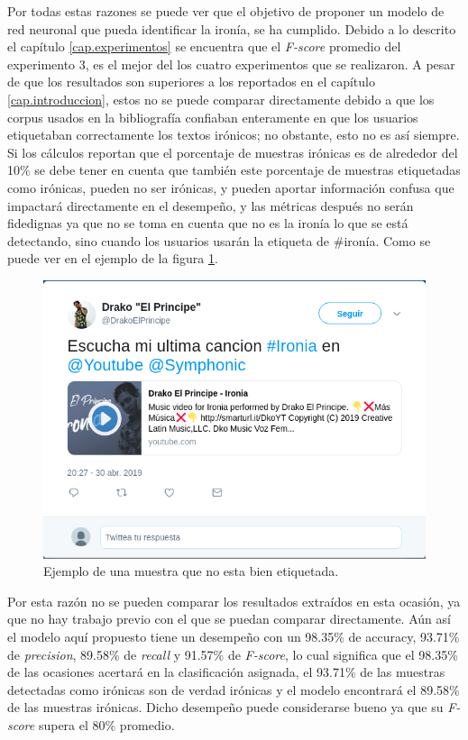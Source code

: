 \par Por todas estas razones se puede ver que el objetivo de proponer un modelo de red neuronal que pueda identificar la ironía, se ha cumplido. Debido a lo descrito el capítulo \ref{cap.experimentos} se encuentra que el \textit{F-score} promedio del experimento 3, es el mejor del los cuatro experimentos que se realizaron. A pesar de que los resultados son superiores a los reportados en el capítulo \ref{cap.introduccion}, estos no se puede comparar directamente debido a que los corpus usados en la bibliografía confiaban enteramente en que los usuarios etiquetaban correctamente los textos irónicos; no obstante, esto no es así siempre. Si los cálculos reportan que el porcentaje de muestras irónicas es de alrededor del 10\% se debe tener en cuenta que también este porcentaje de muestras etiquetadas como irónicas, pueden no ser irónicas, y pueden aportar información confusa que impactará directamente en el desempeño, y las métricas después no serán fidedignas ya que no se toma en cuenta que no es la ironía lo que se está detectando, sino cuando los usuarios usarán la etiqueta de \#ironía. Como se puede ver en el ejemplo de la figura \ref{fig:ejemploNoironia}.
\begin{figure}
	\centering
	\includegraphics[width=0.6\linewidth]{imagenes/ejemploIroniaNoironia.png}
	\caption{Ejemplo de una muestra que no esta bien etiquetada.}
	\label{fig:ejemploNoironia}
\end{figure}

\par Por esta razón no se pueden comparar los resultados extraídos en esta ocasión, ya que no hay trabajo previo con el que se puedan comparar directamente. Aún así el modelo aquí propuesto  tiene un desempeño con un 98.35\% de accuracy, 93.71\% de \textit{precision}, 89.58\% de \textit{recall} y 91.57\% de \textit{F-score}, lo cual significa que el 98.35\% de las ocasiones acertará en la clasificación asignada, el 93.71\% de las muestras detectadas como irónicas son de verdad irónicas y el modelo encontrará el 89.58\% de las muestras irónicas. Dicho desempeño puede considerarse bueno ya que su \textit{F-score} supera el 80\% promedio.

